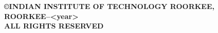\newpage
\thispagestyle{empty}
\mbox{}
\newpage
\thispagestyle{empty}
\null
\vspace{20\baselineskip}
\begin{center}
    \bfseries ©INDIAN INSTITUTE OF TECHNOLOGY ROORKEE, ROORKEE--<year> \\ALL RIGHTS RESERVED
\end{center}

		


